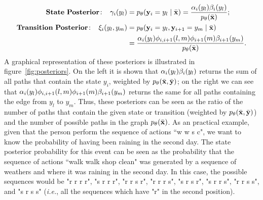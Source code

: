 \begin{align}
 \mathbf{State \ Posterior\!:}\;\;\;\;   \gamma_i({y}_l) &= p_\theta(\mathbf{y}_i = {y}_l \mid \bar{\mathbf{x}}) = \frac{\alpha_i({y}_l) \beta_i({y}_l)}{p_{\theta}(\bar{\mathbf{x}})}; \label{eq::nodePosterior2} \\
 \mathbf{Transition \ Posterior\!:}\;\;\;\;  \xi_i({y}_l,{y}_m) &= p_\theta(\mathbf{y}_i = {y}_l, \mathbf{y}_{i+1}= {y}_m  \mid \bar{\mathbf{x}}) \nonumber\\
 &=  \frac{\alpha_i({y}_l) \phi_{i,i+1}(l,m)\phi_{i+1}(m)\beta_{i+1}({y}_m)}{p_{\theta}(\bar{\mathbf{x}})}.\label{eq::edgePosterior2}
\end{align}
A graphical representation of these posteriors is illustrated in figure~\ref{fig:posteriors}. 
On the left it is shown that $\alpha_i({y}_l) \beta_i({y}_l)$ returns the sum of all paths that contain the state $y_i$, weighted by $p_{\theta}(\bar{\mathbf{x}} ,\bar{\mathbf{y}})$; on the right we can see that $\alpha_i({y}_l) \phi_{i,i+1}(l,m)\phi_{i+1}(m)\beta_{i+1}({y}_m)$ returns the same for all paths containing the edge from $y_l$ to $y_m$.
Thus, these posteriors can be seen as the ratio of the number of paths that contain the given state or transition (weighted by $p_{\theta}(\bar{\mathbf{x}} ,\bar{\mathbf{y}})$) and the number of possible paths in the graph $p_{\theta}(\bar{\mathbf{x}})$.
As an practical example, given that the person perform the sequence of actions ``w w s c", we want to know the probability of having been raining in the second day. The state posterior probability for this event can be seen as the probability that the sequence of actions ``walk walk shop clean" was generated by a sequence of weathers and where it was raining in the second day. In this case, the possible sequences would be "r r r r", "s r r r", "r r s r", "r r r s", "s r s r", "s r r s", "r r s s", and "s r s s" (\emph{i.e.}, all the sequences which have "r" in the second position).

